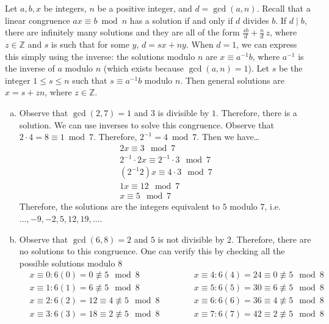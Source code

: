 \documentclass[11pt,letterpaper]{article}
\begin{document}
\sol Let $a, b, x$ be integers, $n$ be a positive integer, and $d= \gcd(a, n)$. Recall that a linear congruence $ax \equiv b \bmod n$ has a solution if and only if $d$ divides $b$. If $d \mid b$, there are infinitely many solutions and they are all of the form $\frac{sb}{d} + \frac{n}{d}\,z$, where $z \in \mathbb{Z}$ and $s$ is such that for some $y$, $d= sx + ny$. When $d= 1$, we can express this simply using the inverse: the solutions modulo $n$ are $x \equiv a^{-1}b$, where $a^{-1}$ is the inverse of $a$ modulo $n$ (which exists because $\gcd(a, n)= 1$). Let $s$ be the integer $1 \leq s \leq n$ such that $s \equiv a^{-1}b$ modulo $n$. Then general solutions are $x= s + zn$, where $z \in \mathbb{Z}$. 

\begin{enumerate}[(a)]
\item Observe that $\gcd(2,7)= 1$ and $3$ is divisible by $1$. Therefore, there is a solution. We can use inverses to solve this congruence. Observe that $2 \cdot 4 = 8 \equiv 1 \bmod 7$. Therefore, $2^{-1} = 4 \bmod 7$. Then we have\dots
	\[
	\begin{gathered}
	2x \equiv 3 \mod 7 \\
	2^{-1} \cdot 2x \equiv 2^{-1} \cdot 3 \mod 7 \\
	(2^{-1}2)x \equiv 4 \cdot 3 \mod 7 \\
	1x \equiv 12 \mod 7 \\
	x \equiv 5 \mod 7
	\end{gathered}
	\]
Therefore, the solutions are the integers equivalent to $5$ modulo $7$, i.e. $\ldots, -9, -2, 5, 12, 19, \ldots$. \pspace

\item Observe that $\gcd(6, 8)= 2$ and $5$ is not divisible by $2$. Therefore, there are no solutions to this congruence. One can verify this by checking all the possible solutions modulo $8$
	\[
	\begin{aligned}
	&x \equiv 0: 6(0)= 0 \not\equiv 5 \mod 8 \hspace{2cm}& &x \equiv 4: 6(4)= 24 \equiv 0 \not\equiv 5 \mod 8 \\
	&x \equiv 1: 6(1)= 6 \not\equiv 5 \mod 8 & &x \equiv 5: 6(5)= 30 \equiv 6 \not\equiv 5 \mod 8 \\
	&x \equiv 2: 6(2)= 12 \equiv 4 \not\equiv 5 \mod 8 & &x \equiv 6: 6(6)= 36 \equiv 4 \not\equiv 5 \mod 8 \\
	&x \equiv 3: 6(3)= 18 \equiv 2 \not\equiv 5 \mod 8 & &x \equiv 7: 6(7)= 42 \equiv 2 \not\equiv 5 \mod 8
	\end{aligned}
	\] \pspace


\end{enumerate}
\end{document}

